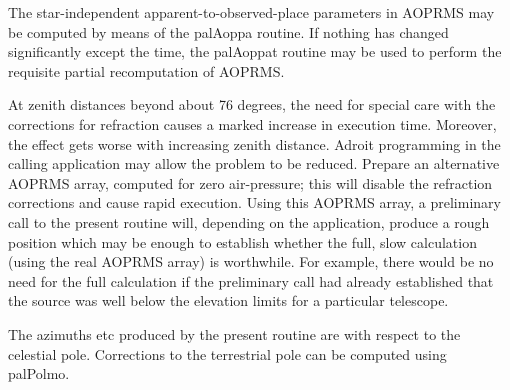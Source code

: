 \documentclass[twoside,11pt]{article}
\renewcommand{\_}{\texttt{\symbol{95}}}
\newcommand{\sstitem}{\item}
\newcommand{\sstitem}{\item}
\begin{document}
{{{         \sstitem
         The star-independent apparent-to-observed-place parameters
           in AOPRMS may be computed by means of the palAoppa routine.
           If nothing has changed significantly except the time, the
           palAoppat routine may be used to perform the requisite
           partial recomputation of AOPRMS.

         \sstitem
         At zenith distances beyond about 76 degrees, the need for
           special care with the corrections for refraction causes a
           marked increase in execution time.  Moreover, the effect
           gets worse with increasing zenith distance.  Adroit
           programming in the calling application may allow the
           problem to be reduced.  Prepare an alternative AOPRMS array,
           computed for zero air-pressure;  this will disable the
           refraction corrections and cause rapid execution.  Using
           this AOPRMS array, a preliminary call to the present routine
           will, depending on the application, produce a rough position
           which may be enough to establish whether the full, slow
           calculation (using the real AOPRMS array) is worthwhile.
           For example, there would be no need for the full calculation
           if the preliminary call had already established that the
           source was well below the elevation limits for a particular
           telescope.

         \sstitem
         The azimuths etc produced by the present routine are with
           respect to the celestial pole.  Corrections to the terrestrial
           pole can be computed using palPolmo.
      }
   }
}
\end{document}

